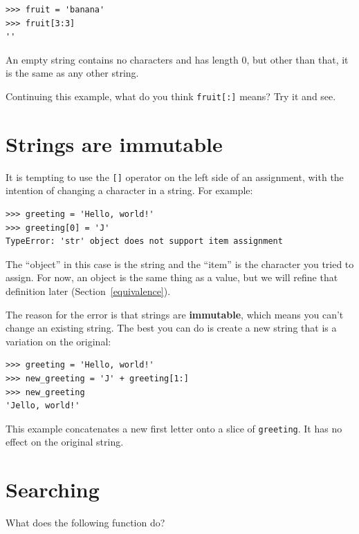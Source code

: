\documentclass[10pt]{book}
\begin{document}
\begin{verbatim}
>>> fruit = 'banana'
>>> fruit[3:3]
''
\end{verbatim}
%
An empty string contains no characters and has length 0, but other
than that, it is the same as any other string.

Continuing this example, what do you think 
{\tt fruit[:]} means?  Try it and see.



\section{Strings are immutable}

It is tempting to use the {\tt []} operator on the left side of an
assignment, with the intention of changing a character in a string.
For example:

\begin{verbatim}
>>> greeting = 'Hello, world!'
>>> greeting[0] = 'J'
TypeError: 'str' object does not support item assignment
\end{verbatim}
%
The ``object'' in this case is the string and the ``item'' is
the character you tried to assign.  For now, an object is
the same thing as a value, but we will refine that definition
later (Section~\ref{equivalence}).  

The reason for the error is that
strings are {\bf immutable}, which means you can't change an
existing string.  The best you can do is create a new string
that is a variation on the original:

\begin{verbatim}
>>> greeting = 'Hello, world!'
>>> new_greeting = 'J' + greeting[1:]
>>> new_greeting
'Jello, world!'
\end{verbatim}
%
This example concatenates a new first letter onto
a slice of {\tt greeting}.  It has no effect on
the original string.


\section{Searching}
\label{find}

What does the following function do?
\end{document}
